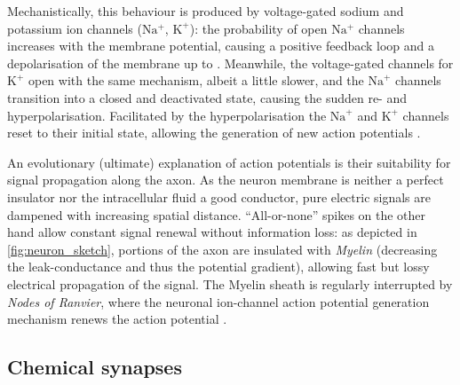 Mechanistically, this behaviour is produced by voltage-gated sodium and potassium ion channels ($\mathrm{Na^+}$, $\mathrm{K^+}$): the probability of open $\mathrm{Na^+}$ channels increases with the membrane potential, causing a positive feedback loop and a depolarisation of the membrane up to \Espike. Meanwhile, the voltage-gated channels for $\mathrm{K}^+$ open with the same mechanism, albeit a little slower, and the $\mathrm{Na}^+$ channels transition into a closed and deactivated state, causing the sudden re- and hyperpolarisation. Facilitated by the hyperpolarisation the $\mathrm{Na}^+$ and $\mathrm{K}^+$ channels reset to their initial state, allowing the generation of new action potentials \cite{kandel2012principles}.

An evolutionary (ultimate) explanation of action potentials is their suitability for signal propagation along the axon. As the neuron membrane is neither a perfect insulator nor the intracellular fluid a good conductor, pure electric signals are dampened with increasing spatial distance.
\enquote{All-or-none} spikes on the other hand allow constant signal renewal without information loss: as depicted in \cref{fig:neuron_sketch}, portions of the axon are insulated with \emph{Myelin} (decreasing the leak-conductance and thus the potential gradient), allowing fast but lossy electrical propagation of the signal. The Myelin sheath is regularly interrupted by \emph{Nodes of Ranvier}, where the neuronal ion-channel action potential generation mechanism renews the action potential \cite{kandel2012principles}.

\subsection{Chemical synapses}
\label{sec:biological_synapses}

